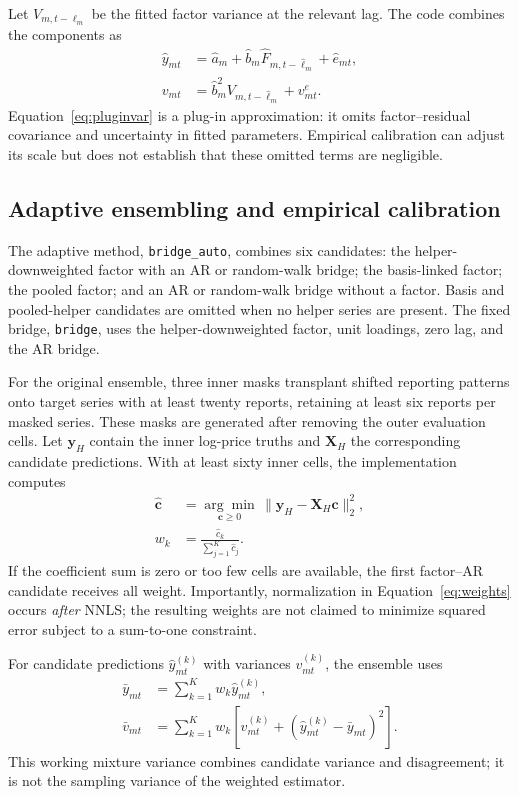\documentclass[sigconf,nonacm,balance=false]{acmart}
\newcommand{\auto}{\texttt{bridge\_auto}}
\newcommand{\fixedbridge}{\texttt{bridge}}
\begin{document}
Let $V_{m,t-\ell_m}$ be the fitted factor variance at the relevant lag. The code combines the components as
\begin{align}
\hat y_{mt}&=\hat a_m+\hat b_m\hat F_{m,t-\hat\ell_m}+\hat e_{mt},\\
v_{mt}&=\hat b_m^2 V_{m,t-\hat\ell_m}+v^e_{mt}. \label{eq:pluginvar}
\end{align}
Equation~\eqref{eq:pluginvar} is a plug-in approximation: it omits factor--residual covariance and uncertainty in fitted parameters. Empirical calibration can adjust its scale but does not establish that these omitted terms are negligible.

\subsection{Adaptive ensembling and empirical calibration}\label{sec:auto}

The adaptive method, \auto{}, combines six candidates: the helper-downweighted factor with an AR or random-walk bridge; the basis-linked factor; the pooled factor; and an AR or random-walk bridge without a factor. Basis and pooled-helper candidates are omitted when no helper series are present. The fixed bridge, \fixedbridge{}, uses the helper-downweighted factor, unit loadings, zero lag, and the AR bridge.

For the original ensemble, three inner masks transplant shifted reporting patterns onto target series with at least twenty reports, retaining at least six reports per masked series. These masks are generated after removing the outer evaluation cells. Let $\mathbf y_H$ contain the inner log-price truths and $\mathbf X_H$ the corresponding candidate predictions. With at least sixty inner cells, the implementation computes
\begin{align}
\hat{\mathbf c}
&=\underset{\mathbf c\ge0}{\arg\min}\,
  \|\mathbf y_H-\mathbf X_H\mathbf c\|_2^2,\label{eq:nnls}\\
w_k&=\frac{\hat c_k}{\sum_{j=1}^K\hat c_j}.\label{eq:weights}
\end{align}
If the coefficient sum is zero or too few cells are available, the first factor--AR candidate receives all weight. Importantly, normalization in Equation~\eqref{eq:weights} occurs \emph{after} NNLS; the resulting weights are not claimed to minimize squared error subject to a sum-to-one constraint.

For candidate predictions $\hat y^{(k)}_{mt}$ with variances $v^{(k)}_{mt}$, the ensemble uses
\begin{align}
\bar y_{mt}&=\sum_{k=1}^K w_k\hat y^{(k)}_{mt},\\
\bar v_{mt}&=\sum_{k=1}^K w_k\left[
v^{(k)}_{mt}+(\hat y^{(k)}_{mt}-\bar y_{mt})^2\right].
\end{align}
This working mixture variance combines candidate variance and disagreement; it is not the sampling variance of the weighted estimator.
\end{document}
